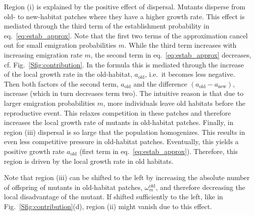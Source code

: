 \documentclass[11pt]{article}
\newcommand{\chg}[1]{\textcolor{change}{#1}}
\begin{document}
Region (i) is explained by the positive effect of dispersal. Mutants disperse from old- to new-habitat patches where they \chg{have a higher growth rate}. This effect is mediated through the third term of the establishment probability in eq.~\eqref{eq:estab_approx}. \chg{Note that the first two terms of the approximation cancel out for small emigration probabilities $m$.}
While the third term increases with increasing emigration rate $m$, the second term in eq.~\eqref{eq:estab_approx} decreases, cf. Fig.~\ref{Sfig:contribution}. 
In the formula this is mediated through \chg{the increase of the local growth rate in the old-habitat, $a_{\text{old}}$, i.e.\ it becomes less negative. Then both factors of the second term, $a_{\text{old}}$ and the difference $(a_{\text{old}}-a_{\text{new}})$, increase (which in turn decreases term two). The }\chg{intuitive} reason is that due to larger emigration probabilities $m$, more individuals leave old habitats before the reproductive event. This relaxes competition in these patches and therefore increases the local growth rate of mutants in old-habitat patches.   
%
Finally, in region (iii) dispersal is so large that the population homogenizes. This results in even less competitive pressure in old-habitat patches. Eventually, this yields a positive growth rate $a_{\text{old}}$ (first term in eq.~\eqref{eq:estab_approx}). Therefore, this region is driven by the local growth rate in old habitats.

Note that region (iii) can be shifted to the left by increasing the absolute number of offspring of mutants in old-habitat patches, $\omega^\text{old}_m$, and therefore decreasing the local disadvantage of the mutant. If shifted sufficiently to the left, like in Fig.~\ref{Sfig:contribution}(d), region (ii) might vanish due to this effect.
\end{document}
